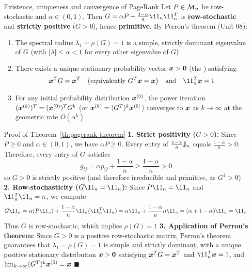 \documentclass[aspectratio=169]{beamer}\usepackage[]{graphicx}\usepackage[]{xcolor}
\begin{document}
\begin{frame}{Existence, uniqueness and convergence of PageRank}
Let $P \in \mathcal{M}_n$ be row-stochastic and $\alpha \in (0, 1)$. Then $G = \alpha P + \frac{1-\alpha}{n}\11_n \11_n^T$ is \textbf{row-stochastic} and \textbf{strictly positive} ($G > 0$), hence \textbf{primitive}. By Perron's theorem (Unit 08):
\vfill
\begin{importanttheorem}
\label{th:pagerank-theorem}
\begin{enumerate}
\item The spectral radius $\lambda_1 = \rho(G) = 1$ is a simple, strictly dominant eigenvalue of $G$ (with $|\lambda| \le \alpha < 1$ for every other eigenvalue of $G$)
\item There exists a unique stationary probability vector $\bx > \b0$ (the ) satisfying
\[
\bx^T G = \bx^T \quad \bigl(\text{equivalently } G^T \bx = \bx\bigr) \quad \text{and} \quad \11_n^T \bx = 1
\]
\item For any initial probability distribution $\bm{x}^{(0)}$, the power iteration $(\bm{x}^{(k)})^T = (\bm{x}^{(0)})^T G^k$ (or $\bm{x}^{(k)} = (G^T)^k \bm{x}^{(0)}$) converges to $\bm{x}$ as $k \to \infty$ at the geometric rate $O(\alpha^k)$
\end{enumerate}
\end{importanttheorem}
\end{frame}

\begin{frame}{Proof of Theorem~\ref{th:pagerank-theorem}}
\textbf{1. Strict positivity ($G > 0$):} Since $P \ge 0$ and $\alpha \in (0, 1)$, we have $\alpha P \ge 0$. Every entry of $\frac{1-\alpha}{n}\mathbb{J}_n$ equals $\frac{1-\alpha}{n} > 0$. Therefore, every entry of $G$ satisfies
\[
g_{ij} = \alpha p_{ij} + \frac{1-\alpha}{n} \ge \frac{1-\alpha}{n} > 0
\]
so $G > 0$ is strictly positive (and therefore irreducible and primitive, as $G^1 > 0$)
\vfill
\textbf{2. Row-stochasticity ($G\11_n = \11_n$):} Since $P\11_n = \11_n$ and $\11_n^T \11_n = n$, we compute
\[
G\11_n = \alpha (P\11_n) + \frac{1-\alpha}{n} \11_n (\11_n^T \11_n) = \alpha \11_n + \frac{1-\alpha}{n} n \11_n = (\alpha + 1 - \alpha)\11_n = \11_n
\]
Thus $G$ is row-stochastic, which implies $\rho(G) = 1$
\vfill
\textbf{3. Application of Perron's theorem:} Since $G > 0$ is a positive row-stochastic matrix, Perron's theorem guarantees that $\lambda_1 = \rho(G) = 1$ is simple and strictly dominant, with a unique positive stationary distribution $\bx > \b0$ satisfying $\bm{x}^T G = \bm{x}^T$ and $\11_n^T \bx = 1$, and $\lim_{k\to\infty} (G^T)^k \bm{x}^{(0)} = \bm{x}$ \hfill $\blacksquare$
\end{frame}
\end{document}
